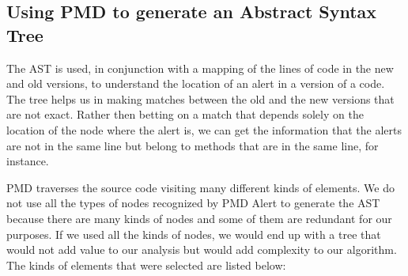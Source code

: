 \documentclass[
]{article}
\begin{document}


\subsection{Using PMD to generate an Abstract Syntax Tree }\label{ast}
The AST is used, in conjunction with a mapping of the lines of code
in the new and old versions, to understand the location of an alert in
a version of a code. The tree helps us in making matches between the
old and the new versions that are not exact. Rather then betting on a
match that depends solely on the location of the node where the alert
is, we can get the information that the alerts are not in the same line
but belong to methods that are in the same line, for instance.



%
%


%
%

PMD traverses the source code visiting many different kinds of elements. 
We do not use all the types of nodes 
recognized by PMD Alert to generate the AST because there are many kinds 
of nodes and some of them are redundant for our purposes. If we used all
the kinds of nodes, we would end up with a tree that would not add value
to our analysis but would add complexity to our algorithm. The kinds of 
elements that were selected are listed below:
\end{document}
